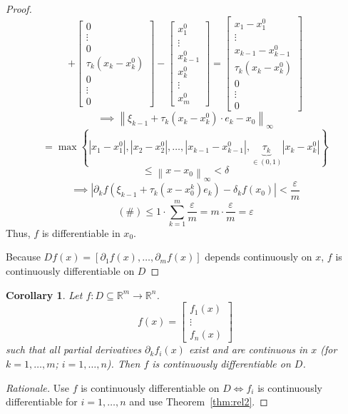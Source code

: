 \documentclass{article}
\newtheorem*{corollary}{Corollary}%
\newcommand{\set}[1]{\left\{#1\right\}}
\newcommand{\norm}[1]{\left\|#1\right\|}
\newcommand{\card}[1]{\left|#1\right|}
\begin{document}
\begin{proof}
\[    + \begin{bmatrix} 0 \\ \vdots \\ 0 \\ \tau_k(x_k - x_k^0) \\ 0 \\ \vdots \\ 0 \end{bmatrix}
    - \begin{bmatrix} x_1^0 \\ \vdots \\ x_{k-1}^0 \\ x_k^0 \\ \vdots \\ x_m^0 \end{bmatrix}
    = \begin{bmatrix} x_1 - x_1^0 \\ \vdots \\ x_{k-1} - x_{k-1}^0 \\ \tau_k(x_k - x_k^0) \\ 0 \\ \vdots \\ 0 \end{bmatrix}
  \] \[
    \implies
    \norm{\xi_{k-1} + \tau_k (x_k - x_k^0) \cdot e_k - x_0}_{\infty}
  \] \[
    = \max\set{\card{x_1 - x_1^0}, \card{x_2 - x_2^0}, \dots, \card{x_{k-1} - x_{k-1}^0}, \underbrace{\tau_k}_{\in (0,1)} \card{x_k - x_k^0}}
  \] \[
    \leq \norm{x - x_0}_{\infty}
    < \delta
  \] \[
    \implies \card{\partial_k f(\xi_{k-1} + \tau_k (x - x_0^k) e_k) - \delta_k f(x_0)} < \frac\varepsilon{m}
  \] \[
    (\#) \leq 1 \cdot \sum_{k=1}^m \frac\varepsilon m = m \cdot \frac\varepsilon m = \varepsilon
  \]
  Thus, $f$ is differentiable in $x_0$.

  Because $Df(x) = [\partial_1 f(x), \dots, \partial_m f(x)]$ depends continuously on $x$,
  $f$ is continuously differentiable on $D$
\end{proof}

\begin{corollary}
  Let $f: D \subseteq \mathbb R^m \to \mathbb R^n$.
  \[ f(x) = \begin{bmatrix} f_1(x) \\ \vdots \\ f_n(x) \end{bmatrix} \]
  such that all partial derivatives $\partial_k f_i(x)$ exist and are continuous in $x$ (for $k=1,\dots,m$; $i=1,\dots,n$).
  Then $f$ is continuously differentiable on $D$.
\end{corollary}
\begin{proof}[Rationale]
  Use $f$ is continuously differentiable on $D \iff f_i$ is continuously differentiable for $i = 1,\dots,n$ and use Theorem~\ref{thm:rel2}.
\end{proof}
\end{document}
